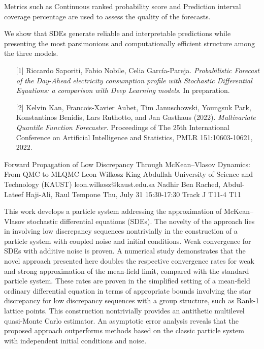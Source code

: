 \begin{talk}
Metrics such as Continuous ranked probability score and Prediction interval coverage percentage are used to assess the quality of the forecasts. 

We show that SDEs generate reliable and interpretable predictions while presenting the most parsimonious and computationally efficient structure among the three models.


\medskip

 

\begin{enumerate}
    \item[{[1]}] Riccardo Saporiti, Fabio Nobile, Celia García-Pareja. {\it Probabilistic Forecast of the Day-Ahead electricity consumption profile with Stochastic Differential Equations: a comparison with Deep Learning models}. In preparation.

	\item[{[2]}] Kelvin Kan, Francois-Xavier Aubet, Tim Januschowski, Youngsuk Park, Konstantinos Benidis, Lars Ruthotto, and Jan Gasthaus (2022). {\it Multivariate Quantile Function Forecaster}. Proceedings of The 25th International Conference on Artificial Intelligence and Statistics, PMLR 151:10603-10621, 2022.
 
\end{enumerate}
 
\end{talk}
\begin{talk}
  {Forward Propagation of Low Discrepancy Through McKean--Vlasov Dynamics: From QMC to MLQMC}%
  {Leon Wilkosz}%
  {King Abdullah University of Science and Technology (KAUST)}%
  {leon.wilkosz@kaust.edu.sa}%
  {Nadhir Ben Rached, Abdul-Lateef Haji-Ali, Raul Tempone}%
  {}%
  {Thu, July 31 15:30-17:30 Track J}%
  {T11-4}%
  {T11}%
			
This work develops a particle system addressing the approximation of \linebreak McKean--Vlasov stochastic differential equations (SDEs). The novelty of the approach lies in involving low discrepancy sequences nontrivially in the construction of a particle system with coupled noise and initial conditions. Weak convergence for SDEs with additive noise is proven. A numerical study demonstrates that the novel approach presented here doubles the respective convergence rates for weak and strong approximation of the mean-field limit, compared with the standard particle system. These rates are proven in the simplified setting of a mean-field ordinary differential equation in terms of appropriate bounds involving the star discrepancy for low discrepancy sequences with a group structure, such as Rank-1 lattice points. This construction nontrivially provides an antithetic multilevel quasi-Monte Carlo estimator. An asymptotic error analysis reveals that the proposed approach outperforms methods based on the classic particle system with independent initial conditions and noise.
\end{talk}
